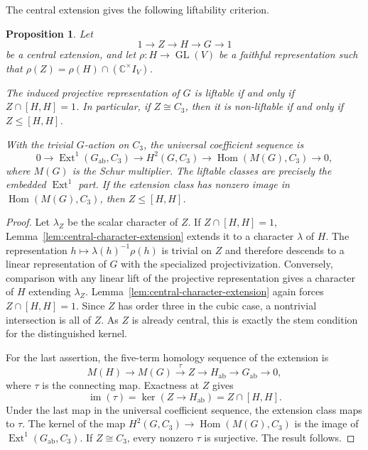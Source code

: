 \documentclass[12pt]{amsart}
\numberwithin{equation}{section}
\theoremstyle{plain}
\newtheorem{prop}[thm]{Proposition}
\theoremstyle{definition}
\theoremstyle{remark}
\newcommand{\CC}{\mathbb C}
\DeclareMathOperator{\GL}{GL}
\DeclareMathOperator{\Hom}{Hom}
\begin{document}
The central extension gives the following liftability criterion.

\begin{prop}\label{prop:stem-liftability}
Let
\[
1\longrightarrow Z\longrightarrow H\longrightarrow G\longrightarrow1
\]
be a central extension, and let $\rho:H\to\GL(V)$ be a faithful representation such that
$\rho(Z)=\rho(H)\cap(\CC^\times I_V)$.

The induced projective representation of $G$ is liftable if and only if
$Z\cap[H,H]=1$.  In particular, if $Z\cong C_3$, then it is non-liftable if
and only if $Z\leq[H,H]$.

With the trivial $G$-action on $C_3$, the universal coefficient
sequence is
\[
0\longrightarrow\operatorname{Ext}^1(G_{\mathrm{ab}},C_3)
\longrightarrow H^2(G,C_3)
\longrightarrow\operatorname{Hom}(M(G),C_3)
\longrightarrow0,
\]
where $M(G)$ is the Schur multiplier.  The liftable classes are precisely
the embedded $\operatorname{Ext}^1$ part.  If the extension class has nonzero image in $\Hom(M(G),C_3)$,
then $Z\le [H,H]$.
\end{prop}

\begin{proof}
Let $\lambda_Z$ be the scalar character of $Z$.  If
$Z\cap[H,H]=1$, Lemma~\ref{lem:central-character-extension} extends it to a
character $\lambda$ of $H$.  The representation
$h\mapsto\lambda(h)^{-1}\rho(h)$ is trivial on $Z$ and therefore descends to
a linear representation of $G$ with the specialized projectivization.
Conversely, comparison with any linear lift of the projective representation
gives a character of $H$ extending $\lambda_Z$.  Lemma~\ref{lem:central-character-extension} again forces
$Z\cap[H,H]=1$.  Since $Z$ has order three in the cubic case, a nontrivial
intersection is all of $Z$.  As $Z$ is already central, this is exactly the
stem condition for the distinguished kernel.

For the last assertion, the five-term homology sequence of the extension is
\[
M(H)\longrightarrow M(G)\xrightarrow{\tau} Z
\longrightarrow H_{\mathrm{ab}}\longrightarrow G_{\mathrm{ab}}
\longrightarrow0,
\]
where $\tau$ is the connecting map.  Exactness at $Z$ gives
\[
\operatorname{im}(\tau)
=\ker(Z\to H_{\mathrm{ab}})
=Z\cap[H,H].
\]
Under the last map in the
universal coefficient sequence, the extension class maps to $\tau$.
The kernel of the map
$H^2(G,C_3)\to\Hom(M(G),C_3)$
is the image of $\operatorname{Ext}^1(G_{\mathrm{ab}},C_3)$. If $Z\cong C_3$,
every nonzero $\tau$ is surjective.  The result follows.
\end{proof}
\end{document}
